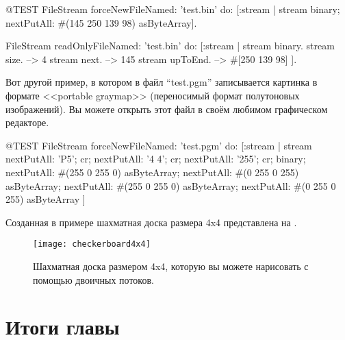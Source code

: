 \documentclass[a4paper,10pt,twoside]{book}
\begin{document}
\begin{code}{@TEST}
FileStream
  forceNewFileNamed: 'test.bin'
  do: [:stream |
          stream
            binary;
            nextPutAll: #(145 250 139 98) asByteArray].

FileStream
  readOnlyFileNamed: 'test.bin'
  do: [:stream |
          stream binary.
          stream size.         --> 4
          stream next.         --> 145
          stream upToEnd. --> #[250 139 98]
      ].
\end{code}

Вот другой пример, в котором в файл ``test.pgm'' записывается картинка в формате <<portable graymap>> (переносимый формат полутоновых изображений). Вы можете открыть этот файл в своём любимом графическом редакторе.

\begin{code}{@TEST}
FileStream
  forceNewFileNamed: 'test.pgm' 
  do: [:stream |
	stream
		nextPutAll: 'P5'; cr;
		nextPutAll: '4 4'; cr;
		nextPutAll: '255'; cr;
		binary;
		nextPutAll: #(255 0 255 0) asByteArray;
		nextPutAll: #(0 255 0 255) asByteArray;
		nextPutAll: #(255 0 255 0) asByteArray;
		nextPutAll: #(0 255 0 255) asByteArray
	]
\end{code}

Созданная в примере шахматная доска размера 4x4 представлена на .

\begin{figure}[!ht]
\centerline{\texttt{[image: checkerboard4x4]}}
\caption{Шахматная доска размером 4x4, которую вы можете нарисовать с помощью двоичных потоков.}
\vspace{.2in}
\end{figure}

\section{Итоги главы}
\end{document}
